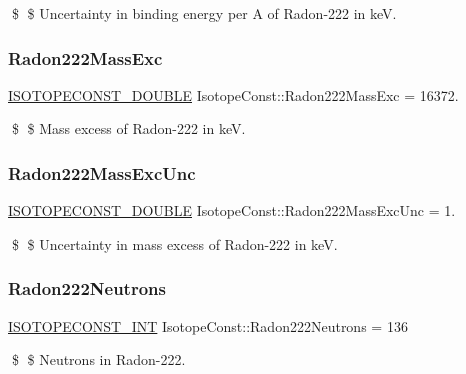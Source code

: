 \$ \$ Uncertainty in binding energy per A of Radon-\/222 in keV. \mbox{\label{group___isotope_const-_radon-_rn222_gad4307c96271c050d85573d6ba59d7e1a}} 
\subsubsection{\texorpdfstring{Radon222\+Mass\+Exc}{Radon222MassExc}}
{\footnotesize\ttfamily \mbox{\hyperlink{group___isotope_const-_macros_ga8f45a7272ce02c0b4c65c44636ed719a}{I\+S\+O\+T\+O\+P\+E\+C\+O\+N\+S\+T\+\_\+\+D\+O\+U\+B\+LE}} Isotope\+Const\+::\+Radon222\+Mass\+Exc = 16372.}

\$ \$ Mass excess of Radon-\/222 in keV. \mbox{\label{group___isotope_const-_radon-_rn222_ga9e688adcb056df584c280b5663689835}} 
\subsubsection{\texorpdfstring{Radon222\+Mass\+Exc\+Unc}{Radon222MassExcUnc}}
{\footnotesize\ttfamily \mbox{\hyperlink{group___isotope_const-_macros_ga8f45a7272ce02c0b4c65c44636ed719a}{I\+S\+O\+T\+O\+P\+E\+C\+O\+N\+S\+T\+\_\+\+D\+O\+U\+B\+LE}} Isotope\+Const\+::\+Radon222\+Mass\+Exc\+Unc = 1.}

\$ \$ Uncertainty in mass excess of Radon-\/222 in keV. \mbox{\label{group___isotope_const-_radon-_rn222_ga82fa9565e69c20288db81461a325118c}} 
\subsubsection{\texorpdfstring{Radon222\+Neutrons}{Radon222Neutrons}}
{\footnotesize\ttfamily \mbox{\hyperlink{group___isotope_const-_macros_ga5f18360b3e99483a35c32d789e62621c}{I\+S\+O\+T\+O\+P\+E\+C\+O\+N\+S\+T\+\_\+\+I\+NT}} Isotope\+Const\+::\+Radon222\+Neutrons = 136}

\$ \$ Neutrons in Radon-\/222. \mbox{\label{group___isotope_const-_radon-_rn222_gaf820000a065fe695769f4a440475b0e8}} 
